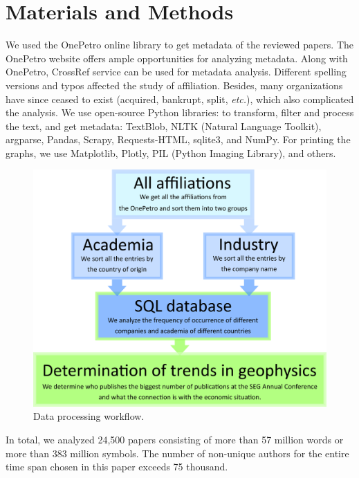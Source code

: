 \documentclass[geosciences,article,submit,moreauthors,pdftex]{Definitions/mdpi}
\begin{document}
\section{Materials and Methods}

We used the OnePetro online library \citep{SPE2019} to get metadata of the reviewed papers. The OnePetro website offers ample opportunities for analyzing metadata. Along with OnePetro, CrossRef service can be used for metadata analysis. Different spelling versions and typos affected the study of affiliation. Besides, many organizations have since ceased to exist (acquired, bankrupt, split, \textit{etc.}), which also complicated the analysis. We use open-source Python libraries: to transform, filter and process the text, and get metadata: TextBlob, NLTK (Natural Language Toolkit), argparse, Pandas, Scrapy, Requests-HTML, sqlite3, and NumPy. For printing the graphs, we use Matplotlib, Plotly, PIL (Python Imaging Library), and others.


\begin{figure}[ht!]
\centering
\includegraphics[scale=1]{scheme_meta.png}
\caption{Data processing workflow.}
\label{scheme_workflow}
\end{figure}


In total, we analyzed 24,500 papers consisting of more than 57 million words or more than 383 million symbols. The number of non-unique authors for the entire time span chosen in this paper exceeds 75 thousand.

 
\end{document}
